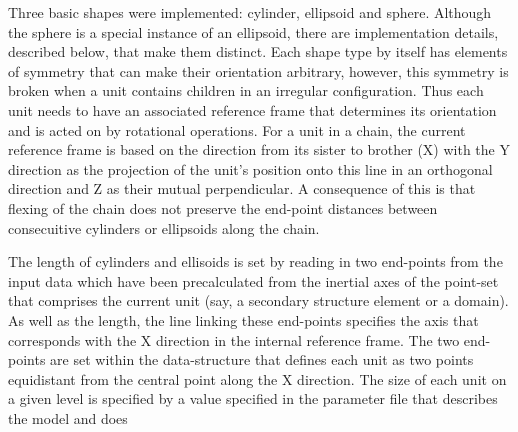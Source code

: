 Three basic shapes were implemented: cylinder, ellipsoid and sphere.  Although the 
sphere is a special instance of an ellipsoid, there are implementation details,
described below, that make them distinct.   Each shape type by itself has elements
of symmetry that can make their orientation arbitrary, however, this symmetry is
broken when a unit contains children in an irregular configuration.  Thus each unit
needs to have an associated reference frame that determines its orientation and is
acted on by rotational operations.   For a unit in a chain, the current reference 
frame is based on the direction from its sister to brother (X) with the Y direction 
as the projection of the unit's position onto this line in an orthogonal direction
and Z as their mutual perpendicular.   A consequence of this is that flexing of the
chain does not preserve the end-point distances between consecuitive cylinders or
ellipsoids along the chain.

The length of cylinders and ellisoids is set by reading in two end-points from the
input data which have been precalculated from the inertial axes of
the point-set that comprises the current unit (say, a secondary structure element or
a domain).  As well as the length, the line linking these end-points specifies the
axis that corresponds with the X direction in the internal reference frame. 
The two end-points are set within the data-structure that defines each unit as
two points equidistant from the central point along the X direction.   The size of
each unit on a given level is specified by a value specified in the parameter file
that describes the model and does 
